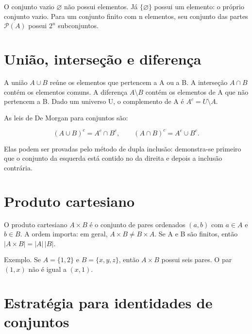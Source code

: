 \documentclass[12pt,a4paper,openany]{book}
\begin{document}
O conjunto vazio $\varnothing$ não possui elementos. Já $\{\varnothing\}$ possui um elemento: o próprio conjunto vazio. Para um conjunto finito com n elementos, seu conjunto das partes $\mathcal{P}(A)$ possui $2^n$ subconjuntos.



\section{União, interseção e diferença}



A união $A\cup B$ reúne os elementos que pertencem a A ou a B. A interseção $A\cap B$ contém os elementos comuns. A diferença $A\setminus B$ contém os elementos de A que não pertencem a B. Dado um universo U, o complemento de A é $A^c=U\setminus A$.



As leis de De Morgan para conjuntos são:



\[(A\cup B)^c=A^c\cap B^c, \qquad (A\cap B)^c=A^c\cup B^c.\]



Elas podem ser provadas pelo método de dupla inclusão: demonstra-se primeiro que o conjunto da esquerda está contido no da direita e depois a inclusão contrária.



\section{Produto cartesiano}



O produto cartesiano $A\times B$ é o conjunto de pares ordenados $(a,b)$ com $a\in A$ e $b\in B$. A ordem importa: em geral, $A\times B\neq B\times A$. Se A e B são finitos, então $|A\times B|=|A|\,|B|$.



\begin{exemplo}{Exemplo.}
Se $A=\{1,2\}$ e $B=\{x,y,z\}$, então $A\times B$ possui seis pares. O par $(1,x)$ não é igual a $(x,1)$.
\end{exemplo}



\section{Estratégia para identidades de conjuntos}
\end{document}
